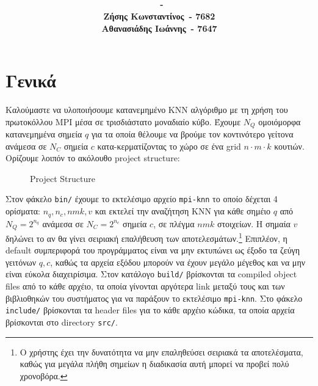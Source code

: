 \documentclass[11pt,a4paper,titlepage]{article}
\title{
	\vspace{5cm}
	\huge{\textbf{\hmwkClass}}\\
	\vspace{9pt}
	\LARGE{\hmwkTitle}\\
	\vspace{7cm}
}
\author{\textbf{\hmwkAuthorName\ - \hmwkAuthorAEM}
		\vspace{0.5em}\\
		\textbf{Ζήσης Κωνσταντίνος\ - 7682}
		\vspace{0.5em}\\
		\textbf{Αθανασιάδης Ιωάννης\ - 7647}}
\date{} %
\begin{document}
	
	\maketitle
	
	
	
	
	
	\section{Γενικά}
	Καλούμαστε να υλοποιήσουμε κατανεμημένο KNN αλγόριθμο με τη χρήση του πρωτοκόλλου MPI μέσα σε τρισδιάστατο μοναδιαίο κύβο. Έχουμε $N_Q$ ομοιόμορφα κατανεμημένα σημεία $q$ για τα οποία θέλουμε να βρούμε τον κοντινότερο γείτονα ανάμεσα σε $N_C$ σημεία $c$ κατα-κερματίζοντας το χώρο σε ένα grid $n\cdot m \cdot k$ κουτιών. Ορίζουμε λοιπόν το ακόλουθο project structure:\\
	
	\begin{wrapfigure}{r}{0.4\textwidth}
		\begin{minipage}[t]{0.4\textwidth}
		\end{minipage}
		\caption{Project Structure}			
	\end{wrapfigure}
	 
	Στον φάκελο \verb|bin/| έχουμε το εκτελέσιμο αρχείο \verb|mpi-knn| το οποίο δέχεται 4 ορίσματα: $n_q, n_c, nmk, v$ και εκτελεί την αναζήτηση ΚΝΝ για κάθε σημέιο $q$ από $N_Q = 2^{n_q}$ ανάμεσα σε 
	$N_C = 2^{n_c}$ σημεία $c$, σε πλέγμα $nmk$ στοιχείων. Η σημαία $v$ δηλώνει το αν θα γίνει σειριακή επαλήθευση των αποτελεσμάτων.\footnote{Ο χρήστης έχει την δυνατότητα να μην επαληθεύσει σειριακά τα αποτελέσματα, καθώς για μεγάλα πλήθη σημείων η διαδικασία αυτή μπορεί να προβεί πολύ χρονοβόρα.} Επιπλέον, η default συμπεριφορά του προγράμματος είναι να μην εκτυπώνει ως έξοδο τα ζεύγη γειτόνων $q,c$, καθώς τα αρχεία εξόδου μπορούν να έχουν μεγάλο μέγεθος και να μην είναι εύκολα διαχειρίσιμα.
	Στον κατάλογο  \verb|build/| βρίσκονται τα compiled object files από το κάθε αρχέιο, τα οποία γίνονται αργότερα link μεταξύ τους και των βιβλιοθηκών του συστήματος για να παράξουν το εκτελέσιμο \verb|mpi-knn|. Στο φάκελο \verb|include/| βρίσκονται τα header files για το κάθε αρχέιο κώδικα,  τα οποία αρχεία βρίσκονται στο directory \verb|src/|.\\
	
\end{document}
